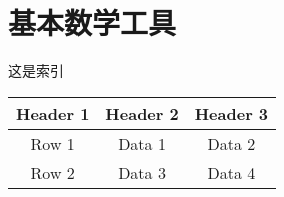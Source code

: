 
\chapter{基本数学工具}
这是索引
\begin{table}[htb]
    \centering
        \begin{tabular}{ccc}
            \toprule
                 Header 1 & Header 2 & Header 3 \\
            \midrule
                Row 1    & Data 1   & Data 2   \\
                Row 2    & Data 3   & Data 4   \\
            \bottomrule
        \end{tabular}
\end{table}